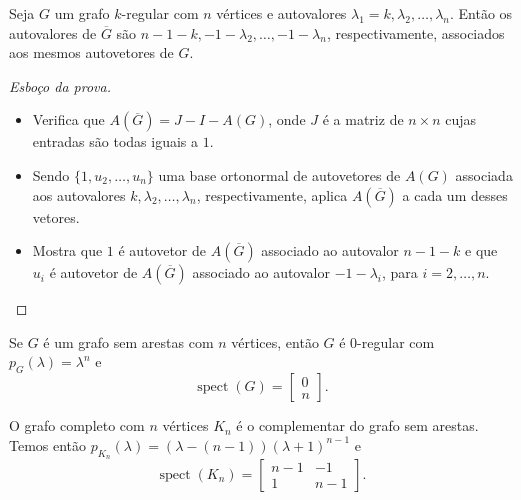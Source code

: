 \documentclass{beamer}
\DeclareMathOperator{\spect}{spect}
\begin{document}
\begin{frame}[allowframebreaks]
    \begin{prop}
        Seja \(G\) um grafo \(k\)-regular com \(n\) vértices e autovalores \(\lambda_1 = k, \lambda_2, \ldots, \lambda_n\). Então os autovalores de \(\overline{G}\) são \(n-1-k, -1-\lambda_2, \ldots, -1-\lambda_n\), respectivamente, associados aos mesmos autovetores de \(G\).
    \end{prop}
    \begin{proof}[Esboço da prova]
        \begin{itemize}
            \item Verifica que \(A(\overline{G}) = J - I - A(G)\), onde \(J\) é a matriz de \(n \times n\) cujas entradas são todas iguais a \(1\).
            \item Sendo \(\{1, u_2, \ldots, u_n\}\) uma base ortonormal de autovetores de \(A(G)\) associada aos autovalores \(k, \lambda_2, \ldots, \lambda_n\), respectivamente, aplica \(A(\overline{G})\) a cada um desses vetores.
            \item Mostra que \(1\) é autovetor de \(A(\overline{G})\) associado ao autovalor \(n-1-k\) e que \(u_i\) é autovetor de \(A(\overline{G})\) associado ao autovalor \(-1-\lambda_i\), para \(i = 2, \ldots, n\).
        \end{itemize}
    \end{proof}
\end{frame}

\begin{frame}
    \begin{exmp}
        Se \(G\) é um grafo sem arestas com \(n\) vértices, então \(G\) é \(0\)-regular com \(p_G(\lambda) = \lambda^n\) e \[\spect(G) = \begin{bmatrix}
            0 \\
            n
        \end{bmatrix}.\]
    \end{exmp}
    \pause
    \begin{exmp}
        O grafo completo com \(n\) vértices \(K_n\) é o complementar do grafo sem arestas. Temos então \(p_{K_n}(\lambda) = (\lambda - (n-1))(\lambda + 1)^{n-1}\) e \[\spect(K_n) = \begin{bmatrix}
            n-1 & -1 \\
            1 & n-1
        \end{bmatrix}.\]
    \end{exmp}
\end{frame}
\end{document}
